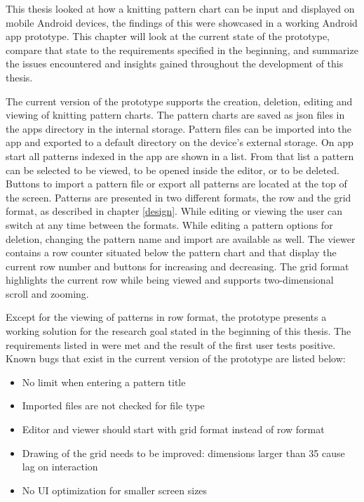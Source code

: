 This thesis looked at how a knitting pattern chart can be input and displayed on mobile Android devices, the findings of this were showcased in a working Android app prototype. This chapter will look at the current state of the prototype, compare that state to the requirements specified in the beginning, and summarize the issues encountered and insights gained throughout the development of this thesis.

The current version of the prototype supports the creation, deletion, editing and viewing of knitting pattern charts. The pattern charts are saved as \gls{json} files in the apps directory in the internal storage. Pattern files can be imported into the app and exported to a default directory on the device's external storage. On app start all patterns indexed in the app are shown in a list. From that list a pattern can be selected to be viewed, to be opened inside the editor, or to be deleted. Buttons to import a pattern file or export all patterns are located at the top of the screen. Patterns are presented in two different formats, the row and the grid format, as described in chapter \ref{design}. While editing or viewing the user can switch at any time between the formats. While editing a pattern options for deletion, changing the pattern name and import are available as well. The viewer contains a row counter situated below the pattern chart and that display the current row number and buttons for increasing and decreasing. The grid format highlights the current row while being viewed and supports two-dimensional scroll and zooming.

Except for the viewing of patterns in row format, the prototype presents a working solution for the research goal stated in the beginning of this thesis. The requirements listed in  were met and the result of the first user tests positive. Known bugs that exist in the current version of the prototype are listed below:

\begin{itemize}
\item No limit when entering a pattern title
\item Imported files are not checked for file type
\item Editor and viewer should start with grid format instead of row format
\item Drawing of the grid needs to be improved: dimensions larger than 35 cause lag on interaction
\item No \gls{UI} optimization for smaller screen sizes
\end{itemize}

